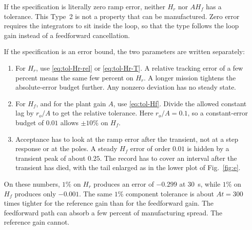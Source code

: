\documentclass[12pt,a4paper]{article}
\begin{document}
If the specification is literally zero ramp error, neither \(H_r\) nor \(A H_f\) has a tolerance. This Type~2 is not a property that can be manufactured.
Zero error requires the integrators to sit inside the loop, so that the type follows the loop gain instead of a feedforward cancellation.

If the specification is an error bound, the two parameters are written separately:
\begin{enumerate}
  \item For \(H_r\), use \eqref{eq:tol-Hr-rel} or \eqref{eq:tol-Hr-T}. A relative tracking error of a few percent means the same few percent on \(H_r\). A longer mission tightens the absolute-error budget further. Any nonzero deviation has no steady state.
  \item For \(H_f\), and for the plant gain \(A\), use \eqref{eq:tol-Hf}. Divide the allowed constant lag by \(r_o/A\) to get the relative tolerance. Here \(r_o/A=0.1\), so a constant-error budget of \(0.01\) allows \(\pm 10\%\) on \(H_f\).
  \item Acceptance has to look at the ramp error after the transient, not at a step response or at the poles. A steady \(H_f\) error of order \(0.01\) is hidden by a transient peak of about \(0.25\). The record has to cover an interval after the transient has died, with the tail enlarged as in the lower plot of Fig.~\ref{fig:e}.
\end{enumerate}

On these numbers, \(1\%\) on \(H_r\) produces an error of \(-0.299\) at 30~s, while \(1\%\) on \(H_f\) produces only \(-0.001\).
The same \(1\%\) component tolerance is about \(At=300\) times tighter for the reference gain than for the feedforward gain.
The feedforward path can absorb a few percent of manufacturing spread. The reference gain cannot.
\end{document}
